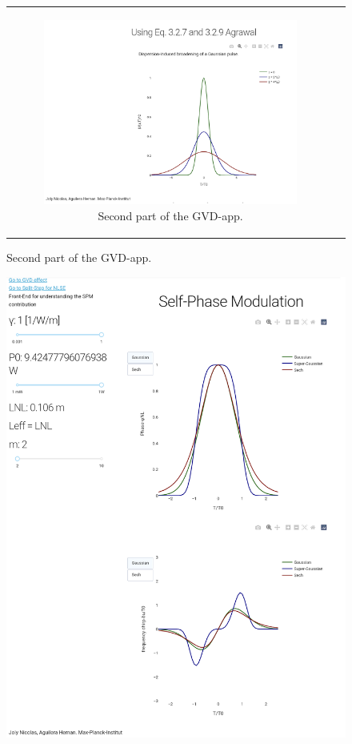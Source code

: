 \begin{figure}[label={fig:herokugvd}, caption={GVD-App accesed via Google Chrome in an Android device.}]
\begin{tabular}[c]{cc}
        \hfill
        \begin{subfigure}[b]{.53\textwidth}
		    \centering	
            \includegraphics[width=1\textwidth]{figures/chap4/android_gvd2.png}
            \caption{Second part of the GVD-app.}
            \label{fig:herokugvd2}
        \end{subfigure}
        \end{tabular}
        \end{figure}
        
        \begin{figure}[label={fig:herokuspm}, caption={SPM-App accesed via Google Chrome in an Android device.}]
        	\includegraphics[width=.8\textwidth]{figures/chap4/android_spm.png} 
        \end{figure}
        

